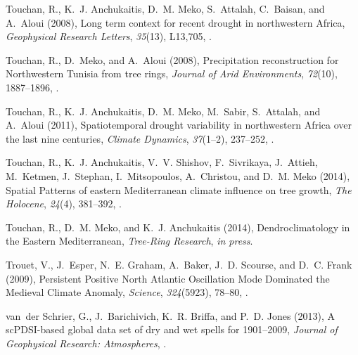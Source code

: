 \documentclass[draft,jgr]{AGUTeX}
\begin{document}
\begin{article}
\begin{thebibliography}{74}
Touchan, R., K.~J. Anchukaitis, D.~M. Meko, S.~Attalah, C.~Baisan, and A.~Aloui
  (2008{}), {Long term context for recent drought in northwestern
  Africa}, \textit{Geophysical Research Letters}, \textit{35}(13), L13,705,
  .

Touchan, R., D.~Meko, and A.~Aloui (2008{}), {Precipitation
  reconstruction for Northwestern Tunisia from tree rings}, \textit{Journal of
  Arid Environments}, \textit{72}(10), 1887--1896,
  .

Touchan, R., K.~J. Anchukaitis, D.~M. Meko, M.~Sabir, S.~Attalah, and A.~Aloui
  (2011), {Spatiotemporal drought variability in northwestern Africa over the
  last nine centuries}, \textit{Climate Dynamics}, \textit{37}(1--2), 237--252,
  .

Touchan, R., K.~J. Anchukaitis, V.~V. Shishov, F.~Sivrikaya, J.~Attieh,
  M.~Ketmen, J.~Stephan, I.~Mitsopoulos, A.~Christou, and D.~M. Meko
  (2014{}), {Spatial Patterns of eastern Mediterranean climate
  influence on tree growth}, \textit{The Holocene}, \textit{24}(4), 381--392,
  .

Touchan, R., D.~M. Meko, and K.~J. Anchukaitis (2014{}),
  {Dendroclimatology in the Eastern Mediterranean}, \textit{Tree-Ring
  Research}, \textit{in press}.

Trouet, V., J.~Esper, N.~E. Graham, A.~Baker, J.~D. Scourse, and D.~C. Frank
  (2009), {Persistent Positive North Atlantic Oscillation Mode Dominated the
  Medieval Climate Anomaly}, \textit{Science}, \textit{324}(5923), 78--80,
  .

van~der Schrier, G., J.~Barichivich, K.~R. Briffa, and P.~D. Jones (2013), {A
  scPDSI-based global data set of dry and wet spells for 1901--2009},
  \textit{Journal of Geophysical Research: Atmospheres},
  .


\end{thebibliography}
\end{article}
\end{document}

